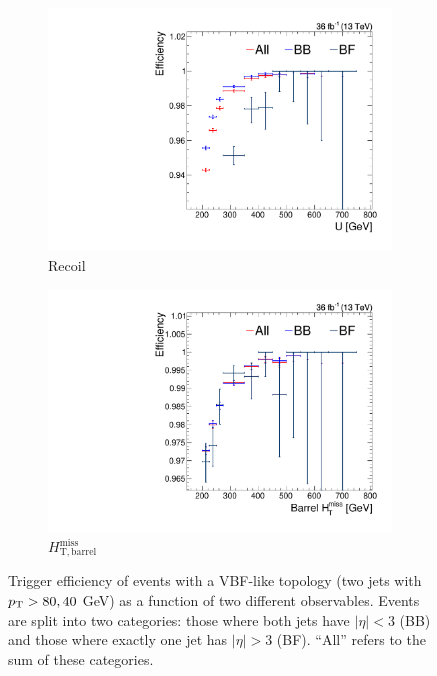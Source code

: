 \begin{figure}[]
    \begin{center}
        \begin{subfigure}[t]{0.49\textwidth}
            \includegraphics[width=\textwidth]{figures/vbf/triggers/trigeff_nmu1pfUWmag.pdf}
            \caption{Recoil}
            \label{fig:vbf:hlta}
        \end{subfigure}
        \begin{subfigure}[t]{0.49\textwidth}
            \includegraphics[width=\textwidth]{figures/vbf/triggers/trigeff_nmu1barrelHTMiss.pdf}
            \caption{$H_\mathrm{T,barrel}^\mathrm{miss}$}
            \label{fig:vbf:hltb}
        \end{subfigure}
        \caption{Trigger efficiency of events with a VBF-like topology (two jets with $p_\mathrm{T}>80,40$ GeV) as a function of two different observables.
                 Events are split into two categories: those where both jets have $|\eta|<3$ (BB) and those where exactly one jet has $|\eta|>3$ (BF).
                 ``All'' refers to the sum of these categories.}
        \label{fig:vbf:hlt}
    \end{center}
\end{figure}

